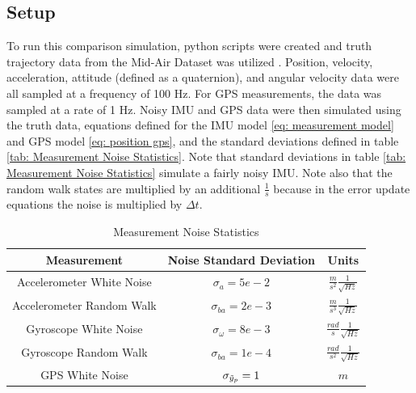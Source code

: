 \subsection{Setup}
To run this comparison simulation, python scripts were created and truth trajectory data from the Mid-Air Dataset was utilized \cite{Fonder2019MidAir}.  Position, velocity, acceleration, attitude (defined as a quaternion), and angular velocity data were all sampled at a frequency of 100 Hz. For GPS measurements, the data was sampled at a rate of 1 Hz. Noisy IMU and GPS data were then simulated using the truth data, equations defined for the IMU model \eqref{eq: measurement model} and GPS model \eqref{eq: position gps}, and the standard deviations defined in table \eqref{tab: Measurement Noise Statistics}. Note that standard deviations in table \eqref{tab: Measurement Noise Statistics} simulate a fairly noisy IMU. Note also that the random walk states are multiplied by an additional $\frac{1}{s}$ because in the error update equations the noise is multiplied by $\Delta t$.
\begin{table}[h!]
\centering
\begin{tabular}{|c|c|c|}
\hline
\textbf{Measurement}& \textbf{Noise Standard Deviation} & \textbf{Units} \\ 
\hline
Accelerometer White Noise & $\sigma_{a} = 5e-2$ & $\frac{m}{s^2} \frac{1}{\sqrt{Hz}}$\\ 
\hline
Accelerometer Random Walk & $\sigma_{ba} = 2e-3$ & $\frac{m}{s^3} \frac{1}{\sqrt{Hz}}$\\  
\hline
Gyroscope White Noise & $\sigma_{\omega} = 8e-3$ & $\frac{rad}{s} \frac{1}{\sqrt{Hz}}$\\ 
\hline
Gyroscope Random Walk & $\sigma_{ba} = 1e-4$ & $\frac{rad}{s^2} \frac{1}{\sqrt{Hz}}$ \\ 
\hline
GPS White Noise & $\sigma_{\Tilde{y}_p} = 1$ & $m$ \\ 
\hline
\end{tabular}
\caption{Measurement Noise Statistics}
\label{tab: Measurement Noise Statistics}
\end{table}


